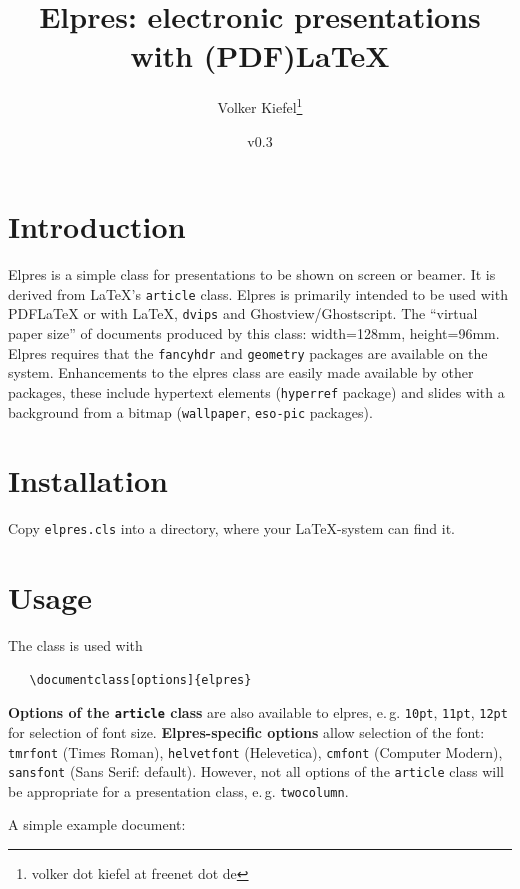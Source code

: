 \documentclass[11pt,a4paper]{article}
\title{\textsf{Elpres}: electronic presentations with (PDF)\LaTeX}
\author{Volker Kiefel\thanks{volker dot kiefel at freenet dot de}}
\date{v0.3}
\begin{document}
\maketitle
\thispagestyle{empty}

{
\setlength{\parskip}{0ex}
\tableofcontents
}

\section{Introduction}

\textsf{Elpres} is a simple class for presentations to be shown on
screen or beamer. It is derived from \LaTeX's \texttt{article} class.
\textsf{Elpres} is primarily intended to be used with PDF\LaTeX{} or with \LaTeX,
\texttt{dvips} and Ghostview/Ghostscript. The ``virtual paper
size'' of documents produced by this class: width=128mm, height=96mm.
\textsf{Elpres} requires that the \texttt{fancyhdr} and \texttt{geometry}
packages are available on the system. Enhancements to the elpres class are
easily made available by other packages, these include hypertext elements
(\texttt{hyperref} package) and slides with a background from a bitmap
(\texttt{wallpaper}, \texttt{eso-pic} packages).


\section{Installation}

Copy \texttt{elpres.cls} into  a directory, where your \LaTeX-system can find
it.

\section{Usage}

The class is used with 
\begin{verbatim}
   \documentclass[options]{elpres}
\end{verbatim}

\textbf{Options of the \texttt{article} class} are also available to elpres,
e.\,g.  \texttt{10pt}, \texttt{11pt}, \texttt{12pt} for selection of font
size.  \textbf{Elpres-specific options} allow selection of the font:
\texttt{tmrfont} (Times Roman), \texttt{helvetfont} (Helevetica),
\texttt{cmfont} (Computer Modern), \texttt{sansfont} (Sans Serif: default).
However, not all options of the \texttt{article} class will be appropriate for
a presentation class, e.\,g.  \texttt{twocolumn}.

A simple example document:
\end{document}

